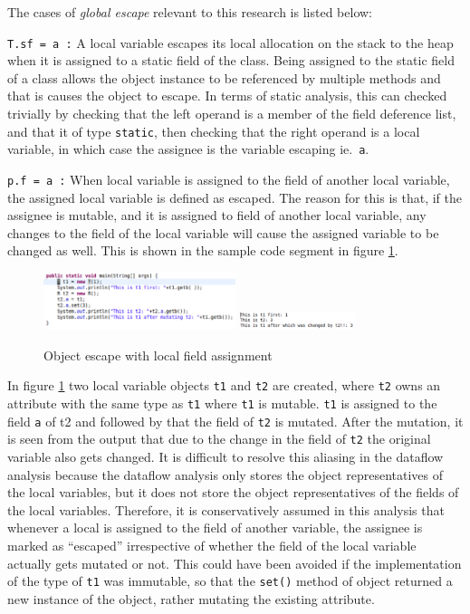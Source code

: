 The cases of \textit{global escape} relevant to this research is listed below:

\texttt{T.sf = a :} A local variable escapes its local allocation on the stack to the heap when it is assigned to a static field of the class. Being assigned to the static field of a class allows the object instance to be referenced by multiple methods and that is causes the object to escape. In terms of static analysis, this can checked trivially by checking that the left operand is a member of the field deference list, and that it of type \texttt{static}, then checking that the right operand is a local variable, in which case the assignee is the variable escaping ie.\ \texttt{a}.

\texttt{p.f = a :} When local variable is assigned to the field of another local variable, the assigned local variable is defined as escaped. The reason for this is that, if the assignee is mutable, and it is assigned to field of another local variable, any changes to the field of the local variable will cause the assigned variable to be changed as well. This is shown in the sample code segment in figure \ref{fig:fieldassignment}.

\begin{figure}[H]
	\caption{Object escape with local field assignment} \label{fig:fieldassignment}
	\includegraphics[width=0.5\textwidth]{img/fieldassignmentcod}
	\includegraphics[width=0.3\textwidth]{img/fieldassignmentresult}
\end{figure}

In figure \ref{fig:fieldassignment} two local variable objects \texttt{t1} and \texttt{t2} are created, where \texttt{t2} owns an attribute with the same type as \texttt{t1} where \texttt{t1} is mutable. \texttt{t1} is assigned to the field \texttt{a} of t2 and followed by that the field of \texttt{t2} is mutated. After the mutation, it is seen from the output that due to the change in the field of \texttt{t2} the original variable also gets changed. It is difficult to resolve this aliasing in the dataflow analysis because the dataflow analysis only stores the object representatives of the local variables, but it does not store the object representatives of the fields of the local variables. Therefore, it is conservatively assumed in this analysis that whenever a local is assigned to the field of another variable, the assignee is marked as ``escaped'' irrespective of whether the field of the local variable actually gets mutated or not. This could have been avoided if the implementation of the type of \texttt{t1} was immutable, so that the \texttt{set()} method of object returned a new instance of the object, rather mutating the existing attribute.

